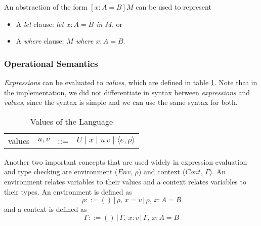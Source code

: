 \documentclass{article}
\theoremstyle{remark}
\begin{document}
An abstraction of the form $[x : A = B] M$ can be used to represent
\begin{itemize}
\item A \textit{let} clause: \textit{let $x : A = B$ in $M$}, or
\item A \textit{where} clause: \textit{$M$ where $x : A = B$}.
\end{itemize}

\subsubsection{Operational Semantics}
\emph{Expressions} can be evaluated to \emph{values}, which are defined in table \ref{tab:values}. Note that in the implementation, we did not differentiate in syntax between \emph{expressions} and \emph{values}, since the syntax is simple and we can use the same syntax for both.
\begin{table}[h]
  \centering
  \begin{tabular}{l l l l}
    values & $u, v$ & ::= & $U \mid x \mid u\, v \mid \langle e, \rho \rangle $
  \end{tabular}
  \caption{Values of the Language}
  \label{tab:values}
\end{table}

Another two important concepts that are used widely in expression evaluation and type checking are environment ($Env,\,\rho$) and context ($Cont,\,\Gamma$). An environment relates variables to their values and a context relates variables to their types. An environment is defined as
\[
\rho ::= ()\,|\,\rho,\,x = v\,|\,\rho,\,x : A = B
\]
and a context is defined as
\[
  \Gamma ::= ()\,|\,\Gamma,\,x : v\,|\,\Gamma,\,x : A = B
\]
\end{document}

